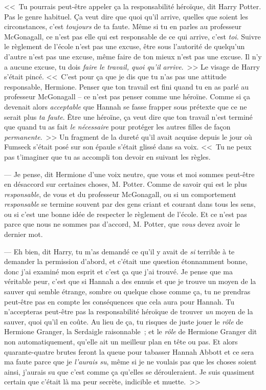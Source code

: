 <<~Tu pourrais peut-être appeler ça la responsabilité héroïque, dit Harry Potter. Pas le genre habituel. Ça veut dire que quoi qu'il arrive, quelles que soient les circonstances, c'est \emph{toujours} de ta faute. Même si tu en parles au professeur McGonagall, ce n'est pas elle qui est responsable de ce qui arrive, c'est \emph{toi}. Suivre le règlement de l'école n'est pas une excuse, être sous l'autorité de quelqu'un d'autre n'est pas une excuse, même faire de ton mieux n'est pas une excuse. Il n'y a aucune excuse, tu dois \emph{faire le travail, quoi qu'il arrive}.~>> Le visage de Harry s'était pincé. <<~C'est pour ça que je dis que tu n'as pas une attitude responsable, Hermione. Penser que ton travail est fini quand tu en as parlé au professeur McGonagall -- ce n'est pas penser comme une héroïne. Comme si ça devenait alors \emph{acceptable} que Hannah se fasse frapper sous prétexte que ce ne serait plus \emph{ta faute}. Être une héroïne, ça veut dire que ton travail n'est terminé que quand tu as fait \emph{le nécessaire} pour protéger les autres filles de façon \emph{permanente}.~>> Un fragment de la dureté qu'il avait acquise depuis le jour où Fumseck s'était posé sur son épaule s'était glissé dans sa voix. <<~Tu ne peux pas t'imaginer que tu as accompli ton devoir en suivant les règles.

--- Je pense, dit Hermione d'une voix neutre, que vous et moi sommes peut-être en désaccord sur certaines choses, M. Potter. Comme de savoir qui est le plus \emph{responsable}, de vous et du professeur McGonagall, ou si un comportement \emph{responsable} se termine souvent par des gens criant et courant dans tous les sens, ou si c'est une bonne idée de respecter le règlement de l'école. Et ce n'est pas parce que nous ne sommes pas d'accord, M. Potter, que \emph{vous} devez avoir le dernier mot.

--- Eh bien, dit Harry, tu m'as demandé ce qu'il y avait de \emph{si} terrible à te demander la permission d'abord, et c'était une question étonnamment bonne, donc j'ai examiné mon esprit et c'est ça que j'ai trouvé. Je pense que ma véritable peur, c'est que si Hannah a des ennuis et que je trouve un moyen de la sauver qui semble étrange, sombre ou quelque chose comme ça, tu ne prendras peut-être pas en compte les conséquences que cela aura pour Hannah. Tu n'accepteras peut-être pas la responsabilité héroïque de trouver \emph{un} moyen de la sauver, quoi qu'il en coûte. Au lieu de ça, tu risques de juste jouer le \emph{rôle} de Hermione Granger, la Serdaigle raisonnable~; et le \emph{rôle} de Hermione Granger dit non automatiquement, qu'elle ait un meilleur plan en tête ou pas. Et alors quarante-quatre brutes feront la queue pour tabasser Hannah Abbott et ce sera ma faute parce que je \emph{l'aurais su}, même si je ne voulais pas que les choses soient ainsi, j'aurais su que c'est comme ça qu'elles se dérouleraient. Je suis quasiment certain que c'était là ma peur secrète, indicible et muette.~>>

